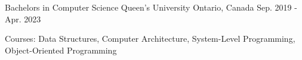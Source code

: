 

\begin{cventries}

  \cventry
    {Bachelors in Computer Science} %
    {Queen's University} %
    {Ontario, Canada} %
    {Sep. 2019 - Apr. 2023} %
    {
      \begin{cvitems} %
        \item {Courses: Data Structures, Computer Architecture, System-Level Programming, Object-Oriented Programming}
      \end{cvitems}
    }

\end{cventries}
